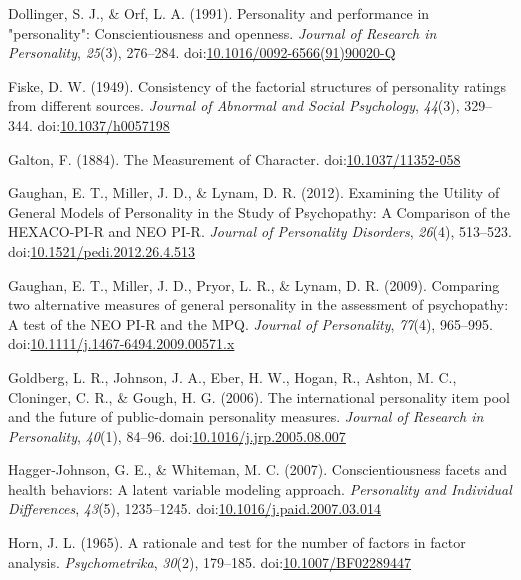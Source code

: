 \documentclass[,man,floatsintext]{apa6}
\theoremstyle{definition}
\theoremstyle{definition}
\theoremstyle{definition}
\theoremstyle{remark}
\begin{document}
\leavevmode\hypertarget{ref-Dollinger1991}{}%
Dollinger, S. J., \& Orf, L. A. (1991). Personality and performance in
"personality": Conscientiousness and openness. \emph{Journal of Research
in Personality}, \emph{25}(3), 276--284.
doi:\href{https://doi.org/10.1016/0092-6566(91)90020-Q}{10.1016/0092-6566(91)90020-Q}

\leavevmode\hypertarget{ref-Fiske1949}{}%
Fiske, D. W. (1949). Consistency of the factorial structures of
personality ratings from different sources. \emph{Journal of Abnormal
and Social Psychology}, \emph{44}(3), 329--344.
doi:\href{https://doi.org/10.1037/h0057198}{10.1037/h0057198}

\leavevmode\hypertarget{ref-Galton1884}{}%
Galton, F. (1884). The Measurement of Character.
doi:\href{https://doi.org/10.1037/11352-058}{10.1037/11352-058}

\leavevmode\hypertarget{ref-Gaughan2012}{}%
Gaughan, E. T., Miller, J. D., \& Lynam, D. R. (2012). Examining the
Utility of General Models of Personality in the Study of Psychopathy: A
Comparison of the HEXACO-PI-R and NEO PI-R. \emph{Journal of Personality
Disorders}, \emph{26}(4), 513--523.
doi:\href{https://doi.org/10.1521/pedi.2012.26.4.513}{10.1521/pedi.2012.26.4.513}

\leavevmode\hypertarget{ref-Gaughan2009}{}%
Gaughan, E. T., Miller, J. D., Pryor, L. R., \& Lynam, D. R. (2009).
Comparing two alternative measures of general personality in the
assessment of psychopathy: A test of the NEO PI-R and the MPQ.
\emph{Journal of Personality}, \emph{77}(4), 965--995.
doi:\href{https://doi.org/10.1111/j.1467-6494.2009.00571.x}{10.1111/j.1467-6494.2009.00571.x}

\leavevmode\hypertarget{ref-Goldberg2006}{}%
Goldberg, L. R., Johnson, J. A., Eber, H. W., Hogan, R., Ashton, M. C.,
Cloninger, C. R., \& Gough, H. G. (2006). The international personality
item pool and the future of public-domain personality measures.
\emph{Journal of Research in Personality}, \emph{40}(1), 84--96.
doi:\href{https://doi.org/10.1016/j.jrp.2005.08.007}{10.1016/j.jrp.2005.08.007}

\leavevmode\hypertarget{ref-Hagger-Johnson2007}{}%
Hagger-Johnson, G. E., \& Whiteman, M. C. (2007). Conscientiousness
facets and health behaviors: A latent variable modeling approach.
\emph{Personality and Individual Differences}, \emph{43}(5), 1235--1245.
doi:\href{https://doi.org/10.1016/j.paid.2007.03.014}{10.1016/j.paid.2007.03.014}

\leavevmode\hypertarget{ref-Horn1965}{}%
Horn, J. L. (1965). A rationale and test for the number of factors in
factor analysis. \emph{Psychometrika}, \emph{30}(2), 179--185.
doi:\href{https://doi.org/10.1007/BF02289447}{10.1007/BF02289447}
\end{document}
